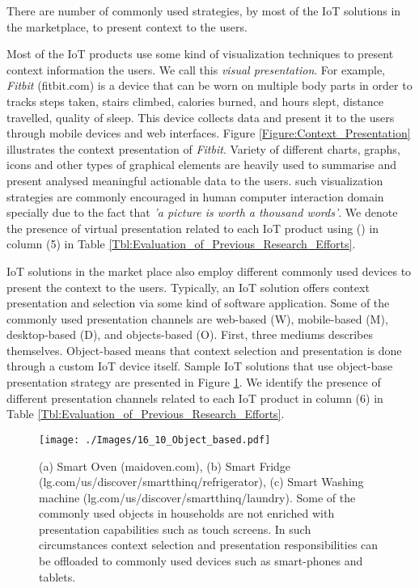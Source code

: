 \documentclass[journal]{IEEEtran}
\begin{document}
 
There are number of commonly used strategies, by most of the IoT solutions in the marketplace, to present context to the users.
 
Most of the IoT products use some kind of visualization techniques to present context information the users. We call this \textit{visual presentation}. For example, \textit{Fitbit}  (fitbit.com) is a device that can be worn on multiple body parts in order to tracks steps taken, stairs climbed, calories burned, and hours slept, distance travelled, quality of sleep. This device collects data and present it to the users through mobile devices and web interfaces. Figure \ref{Figure:Context_Presentation} illustrates the context presentation of \textit{Fitbit}. Variety of different charts, graphs, icons and other types of graphical elements are heavily used to summarise and present analysed meaningful actionable data to the users. such visualization strategies are commonly encouraged in human computer interaction domain specially due to the fact that \textit{'a picture is worth a thousand words'}. We denote the presence of virtual presentation related to each IoT product using (\checkmark) in column (5) in Table \ref{Tbl:Evaluation_of_Previous_Research_Efforts}.
 
 
 

 
 
IoT solutions in the market place also employ different commonly used devices to present the context to the users. Typically, an IoT solution offers context presentation and selection via some kind of software application. Some of the commonly used presentation channels are web-based (W), mobile-based (M), desktop-based  (D), and objects-based (O). First, three mediums describes themselves. Object-based means that context selection and presentation is done through  a custom IoT device itself. Sample IoT solutions that use object-base presentation strategy are presented in Figure \ref{Figure:Object_based}. We identify the presence of different  presentation channels related to each IoT product  in column (6) in Table \ref{Tbl:Evaluation_of_Previous_Research_Efforts}.
 
 
 
   \begin{figure}[!h]
    \centering
\texttt{[image: ./Images/16\_10\_Object\_based.pdf]}
\caption{(a) Smart Oven (maidoven.com), (b) Smart Fridge (lg.com/us/discover/smartthinq/refrigerator), (c) Smart Washing machine (lg.com/us/discover/smartthinq/laundry). Some of the commonly used objects in households are not enriched with presentation capabilities such as touch screens. In such circumstances  context selection and presentation responsibilities can be offloaded to commonly used devices such as smart-phones and tablets.}
    \label{Figure:Object_based}	
\end{figure}
 
\end{document}
